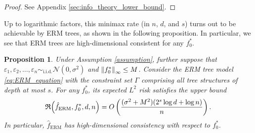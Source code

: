 \documentclass[11pt]{article}
\newtheorem{proposition}[theorem]{Proposition}
\newtheorem{definition}[theorem]{Definition}
\DeclarePairedDelimiter{\braces}{\lbrace}{\rbrace}
\DeclarePairedDelimiter{\paren}{(}{)}
\DeclarePairedDelimiter{\norm}{\|}{\|}
\newcommand{\E}{\mathbb{E}}
\newcommand{\sparsity}{s}
\newcommand{\nfeats}{d}
\newcommand{\nsamples}{n}
\newcommand{\data}[1][n]{\mathcal{D}_{#1}}
\newcommand{\funcclass}{\mathfrak{F}}
\newcommand{\ferm}{\hat{f}_{\operatorname{ERM}}}
\newcommand{\objective}{\mathfrak{R}}
\newcommand{\constraint}{\Gamma}
\newcommand{\sparsefuncs}{\funcclass_\sparsity}
\begin{document}
\begin{proof}
    See Appendix \ref{sec:info_theory_lower_bound}.
\end{proof}





Up to logarithmic factors, this minimax rate (in $\nsamples$, $\nfeats$, and $\sparsity$) turns out to be achievable by ERM trees, as shown in the following proposition.
In particular, we see that ERM trees are high-dimensional consistent for any $f_0^*$. 

\begin{proposition}
    \label{prop:erm_upper_bound}
    Under Assumption \ref{assumption}, further suppose that $\varepsilon_1,\varepsilon_2,\ldots,\varepsilon_\nsamples \sim_{\text{i.i.d.}} \mathcal{N}(0,\sigma^2)$ and $\norm*{f_0^*}_\infty \leq M$.
    Consider the ERM tree model \eqref{eq:ERM_equation} with the constraint set $\constraint$ comprising all tree structures of depth at most $\sparsity$.
    For any $f^*_0$, its expected $L^2$ risk satisfies the upper bound
    \begin{equation}
        \label{eq:ERM_rate}
        \objective\paren*{\ferm, f^*_0,\nfeats,\nsamples} = O\left(\frac{(\sigma^2+M^2)(2^s\log\nfeats + \log\nsamples)}{n}\right).
    \end{equation}
    In particular, $\ferm$ has high-dimensional consistency with respect to $f_0^*$.
\end{proposition}
\end{document}
